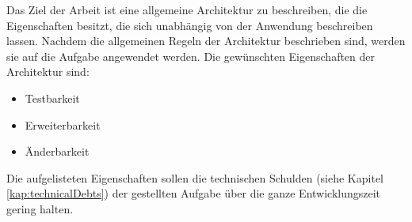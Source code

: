 Das Ziel der Arbeit ist eine allgemeine Architektur zu beschreiben, 
die die Eigenschaften besitzt, die sich unabhängig von der Anwendung beschreiben lassen. 
Nachdem die allgemeinen Regeln der Architektur beschrieben sind, werden sie auf die Aufgabe angewendet werden.
Die gewünschten Eigenschaften der Architektur sind:
\begin{itemize}
    \item Testbarkeit
    \item Erweiterbarkeit
    \item Änderbarkeit
\end{itemize}

Die aufgelisteten Eigenschaften sollen die technischen Schulden (siehe Kapitel \ref{kap:technicalDebts}) der gestellten Aufgabe 
über die ganze Entwicklungszeit gering halten. 
